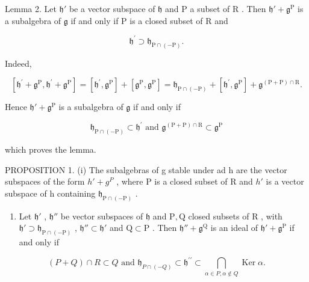 Lemma 2. Let \(\mathfrak{h}'\) be a vector subspace of \(\mathfrak{h}\) and \(\mathrm{P}\) a subset of \(\mathrm{R}\) . Then \(\mathfrak{h}' + \mathfrak{g}^{\mathrm{P}}\) is a subalgebra of \(\mathfrak{g}\) if and only if \(\mathrm{P}\) is a closed subset of \(\mathrm{R}\) and

\[
\mathfrak {h} ^ {\prime} \supset \mathfrak {h} _ {\mathrm{P} \cap (- \mathrm{P})}.
\]

Indeed,

\[
[ \mathfrak {h} ^ {\prime} + \mathfrak {g} ^ {\mathrm{P}}, \mathfrak {h} ^ {\prime} + \mathfrak {g} ^ {\mathrm{P}} ] = [ \mathfrak {h} ^ {\prime}, \mathfrak {g} ^ {\mathrm{P}} ] + [ \mathfrak {g} ^ {\mathrm{P}}, \mathfrak {g} ^ {\mathrm{P}} ] = \mathfrak {h} _ {\mathrm{P} \cap (- \mathrm{P})} + [ \mathfrak {h} ^ {\prime}, \mathfrak {g} ^ {\mathrm{P}} ] + \mathfrak {g} ^ {(\mathrm{P} + \mathrm{P}) \cap \mathrm{R}}.
\]

Hence \(\mathfrak{h}' + \mathfrak{g}^{\mathrm{P}}\) is a subalgebra of \(\mathfrak{g}\) if and only if

\[
\mathfrak {h} _ {\mathrm{P} \cap (- \mathrm{P})} \subset \mathfrak {h} ^ {\prime} \text { and } \mathfrak {g} ^ {(\mathrm{P} + \mathrm{P}) \cap \mathrm{R}} \subset \mathfrak {g} ^ {\mathrm{P}}
\]

which proves the lemma.

PROPOSITION 1. (i) The subalgebras of g stable under ad h are the vector subspaces of the form \(h' + g^{P}\) , where P is a closed subset of R and \(h'\) is a vector subspace of h containing \(\mathfrak{h}_{\mathrm{P}\cap(-\mathrm{P})}\) .

\begin{enumerate}
\def\labelenumi{(\roman{enumi})}
\setcounter{enumi}{1}
\tightlist
\item
  Let \(\mathfrak{h}'\) , \(\mathfrak{h}''\) be vector subspaces of \(\mathfrak{h}\) and \(\mathrm{P},\mathrm{Q}\) closed subsets of \(\mathrm{R}\) , with \(\mathfrak{h}'\supset \mathfrak{h}_{\mathrm{P}\cap (-\mathrm{P})}\) , \(\mathfrak{h}''\subset \mathfrak{h}'\) and \(\mathrm{Q}\subset \mathrm{P}\) . Then \(\mathfrak{h}'' + \mathfrak{g}^{\mathrm{Q}}\) is an ideal of \(\mathfrak{h}' + \mathfrak{g}^{\mathrm{P}}\) if and only if
\end{enumerate}

\[
(P + Q) \cap R \subset Q \text { and } \mathfrak {h} _ {P \cap (- Q)} \subset \mathfrak {h} ^ {\prime \prime} \subset \bigcap_ {\alpha \in P, \alpha \notin Q} \operatorname{Ker} \alpha .
\]

